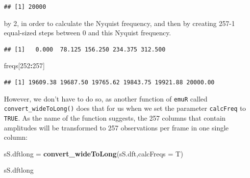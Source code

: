 \documentclass[]{book}
\newenvironment{Shaded}{\begin{snugshade}}{\end{snugshade}}
\newcommand{\DataTypeTok}[1]{\textcolor[rgb]{0.13,0.29,0.53}{#1}}
\newcommand{\DecValTok}[1]{\textcolor[rgb]{0.00,0.00,0.81}{#1}}
\newcommand{\KeywordTok}[1]{\textcolor[rgb]{0.13,0.29,0.53}{\textbf{#1}}}
\newcommand{\NormalTok}[1]{#1}
\newcommand{\OperatorTok}[1]{\textcolor[rgb]{0.81,0.36,0.00}{\textbf{#1}}}
\newcommand{\StringTok}[1]{\textcolor[rgb]{0.31,0.60,0.02}{#1}}
\begin{document}
\begin{Shaded}
\end{Shaded}

\begin{verbatim}
## [1] 20000
\end{verbatim}

by 2, in order to calculate the Nyquist frequency, and then by creating 257-1 equal-sized steps between 0 and this Nyquist frequency.

\begin{Shaded}
\end{Shaded}

\begin{verbatim}
## [1]   0.000  78.125 156.250 234.375 312.500
\end{verbatim}

\begin{Shaded}
\begin{Highlighting}[]
\NormalTok{freqs[}\DecValTok{252}\OperatorTok{:}\DecValTok{257}\NormalTok{]}
\end{Highlighting}
\end{Shaded}

\begin{verbatim}
## [1] 19609.38 19687.50 19765.62 19843.75 19921.88 20000.00
\end{verbatim}

However, we don't have to do so, as another function of \texttt{emuR} called \texttt{convert\_wideToLong()} does that for us when we set the parameter \texttt{calcFreq} to \texttt{TRUE}. As the name of the function suggests, the 257 columns that contain amplitudes will be transformed to 257 observations per frame in one single column:

\begin{Shaded}
\begin{Highlighting}[]
\NormalTok{sS.dftlong =}\StringTok{ }\KeywordTok{convert_wideToLong}\NormalTok{(sS.dft,}\DataTypeTok{calcFreqs =}\NormalTok{ T)}

\NormalTok{sS.dftlong}
\end{Highlighting}
\end{Shaded}
\end{document}
